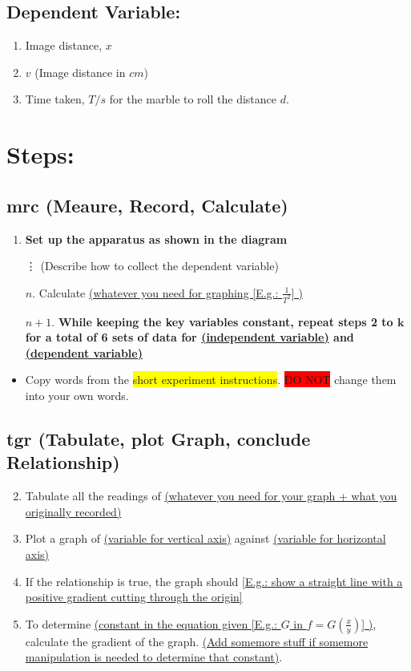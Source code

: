 \documentclass[oneside]{book}
\begin{document}
\subsection{Dependent Variable:}
\begin{enumerate}
    \item Image distance, \(x\) 
    \item \(v\) (Image distance in \(cm\))
    \item Time taken, \(T/s\) for the marble to roll the distance \(d\).
\end{enumerate}
\section{Steps:}
\subsection{mrc (Meaure, Record, Calculate)}
\begin{enumerate}
    \item \textbf{Set up the apparatus as shown in the diagram}\\
    \item[\vdots \vspace{1mm} ] (Describe how to collect the dependent variable)
    \item[\(n.\)] Calculate \uline{(whatever you need for graphing [E.g.: \(\frac{1}{T^2}\)] )}
    \item[\(n+1\).] \textbf{While keeping the key variables constant, repeat steps 2 to \(\mathbf{k}\) for a total of 6 sets of data for \uline{(independent variable)} and \uline{(dependent variable)}}  
\end{enumerate}
\begin{itemize}[label=\(\square\)]
    \item Copy words from the \colorbox{yellow}{short experiment instructions}. \colorbox{red}{DO NOT} change them into your own words.
\end{itemize}
\subsection{tgr (Tabulate, plot Graph, conclude Relationship)} 
\begin{enumerate}[label=\(n+\arabic*.\)]
    \setcounter{enumi}{1}
    \item Tabulate all the readings of \footnotesize \uline{(whatever you need for your graph + what you originally recorded)} \footnotesize
    \item Plot a graph of \uline{(variable for vertical axis)} against \uline{(variable for horizontal axis)}
    \item If the relationship is true, the graph should \uline{[E.g.: show a straight line with a positive gradient cutting through the origin]}
    \item To determine \uline{(constant in the equation given [E.g.: \(G\) in \(f=G ( \frac{x}{y} )\)] )}, calculate the gradient of the graph. \uline{(Add somemore stuff if somemore manipulation is needed to determine that constant)}. 
\end{enumerate}
\newpage
\end{document}
